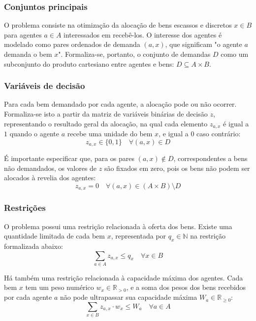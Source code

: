 \documentclass[
    12pt,
    openany,
    oneside,
    a4paper,
    english,
    brazil
]{abntex2}
\begin{document}
\subsubsection{Conjuntos principais}

O problema consiste na otimização da alocação de bens escassos e discretos $x \in B$ para agentes $a \in A$ interessados em recebê-los. O interesse dos agentes é modelado como pares ordenados de demanda $(a, x)$, que significam "o agente $a$ demanda o bem $x$". Formaliza-se, portanto, o conjunto de demandas $D$ como um subconjunto do produto cartesiano entre agentes e bens: $D \subseteq A \times B$.

\subsubsection{Variáveis de decisão}

Para cada bem demandado por cada agente, a alocação pode ou não ocorrer. Formaliza-se isto a partir da matriz de variáveis binárias de decisão $z$, representando o resultado geral da alocação, na qual cada elemento $z_{a, x}$ é igual a $1$ quando o agente $a$ recebe uma unidade do bem $x$, e igual a $0$ caso contrário:
\begin{equation}
    z_{a, x} \in \{0, 1\} \quad \forall (a, x) \in D
\end{equation}

É importante especificar que, para os pares $(a, x) \notin D$, correspondentes a bens não demandados, os valores de $z$ são fixados em zero, pois os bens não podem ser alocados à revelia dos agentes:
\begin{equation} \label{eq:sem-revelia}
    z_{a, x} = 0 \quad \forall (a, x) \in (A \times B) \setminus D
\end{equation}

\subsubsection{Restrições}

O problema possui uma restrição relacionada à oferta dos bens. Existe uma quantidade limitada de cada bem $x$, representada por $q_{x} \in \mathbb{N}$ na restrição formalizada abaixo:
\begin{equation} \label{eq:vagas}
    \sum_{a \in A} z_{a, x} \leq q_x \quad \forall x \in B
\end{equation}

Há também uma restrição relacionada à capacidade máxima dos agentes. Cada bem $x$ tem um peso numérico $w_x \in \mathbb{R}_{>0}$, e a soma dos pesos dos bens recebidos por cada agente $a$ não pode ultrapassar sua capacidade máxima $W_a \in \mathbb{R}_{\geq0}$:
\begin{equation} \label{eq:capacidade}
    \sum_{x \in B} z_{a, x} \cdot w_x \leq W_a \quad \forall a \in A
\end{equation}
\end{document}
